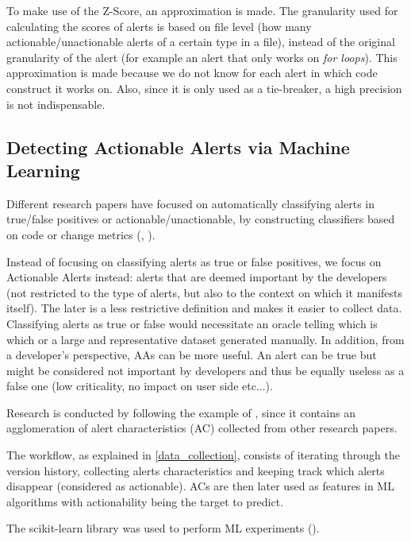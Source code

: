 \documentclass{article}
\begin{document}
To make use of the Z-Score, an approximation is made. The granularity used for calculating the scores of alerts is based on file level (how many actionable/unactionable alerts of a certain type in a file), instead of the original granularity of the alert (for example an alert that only works on \textit{for loops}). This approximation is made because we do not know for each alert in which code construct it works on. Also, since it is only used as a tie-breaker, a high precision is not indispensable.

\subsection{Detecting Actionable Alerts via Machine Learning}

Different research papers have focused on automatically classifying alerts in true/false positives or actionable/unactionable, by constructing classifiers based on code or change metrics (\cite{actionable_sa}, \cite{model_building_actionable}).

Instead of focusing on classifying alerts as true or false positives, we focus on Actionable Alerts instead: alerts that are deemed important by the developers (not restricted to the type of alerts, but also to the context on which it manifests itself). The later is a less restrictive definition and makes it easier to collect data. Classifying alerts as true or false would necessitate an oracle telling which is which or a large and representative dataset generated manually. In addition, from a developer's perspective, AAs can be more useful. An alert can be true but might be considered not important by developers and thus be equally useless as a false one (low criticality, no impact on user side etc...).

Research is conducted by following the example of \cite{model_building_actionable}, since it contains an agglomeration of alert characteristics (AC) collected from other research papers.

The workflow, as explained in \cref{data_collection}, consists of iterating through the version history, collecting alerts characteristics and keeping track which alerts disappear (considered as actionable). ACs are then later used as features in ML algorithms with actionability being the target to predict.

The scikit-learn library was used to perform ML experiments (\cite{scikit-learn}).
\end{document}

